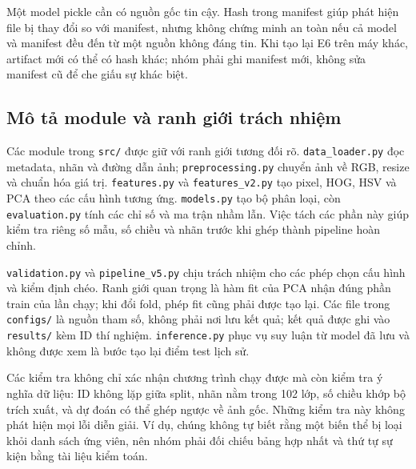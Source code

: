 Một model pickle cần có nguồn gốc tin cậy. Hash trong manifest giúp phát hiện file bị thay đổi so với manifest, nhưng không chứng minh an toàn nếu cả model và manifest đều đến từ một nguồn không đáng tin. Khi tạo lại E6 trên máy khác, artifact mới có thể có hash khác; nhóm phải ghi manifest mới, không sửa manifest cũ để che giấu sự khác biệt.
\subsection{Mô tả module và ranh giới trách nhiệm}
Các module trong \texttt{src/} được giữ với ranh giới tương đối rõ. \texttt{data\_loader.py} đọc metadata, nhãn và đường dẫn ảnh; \texttt{preprocessing.py} chuyển ảnh về RGB, resize và chuẩn hóa giá trị. \texttt{features.py} và \texttt{features\_v2.py} tạo pixel, HOG, HSV và PCA theo các cấu hình tương ứng. \texttt{models.py} tạo bộ phân loại, còn \texttt{evaluation.py} tính các chỉ số và ma trận nhầm lẫn. Việc tách các phần này giúp kiểm tra riêng số mẫu, số chiều và nhãn trước khi ghép thành pipeline hoàn chỉnh.

\texttt{validation.py} và \texttt{pipeline\_v5.py} chịu trách nhiệm cho các phép chọn cấu hình và kiểm định chéo. Ranh giới quan trọng là hàm fit của PCA nhận đúng phần train của lần chạy; khi đổi fold, phép fit cũng phải được tạo lại. Các file trong \texttt{configs/} là nguồn tham số, không phải nơi lưu kết quả; kết quả được ghi vào \texttt{results/} kèm ID thí nghiệm. \texttt{inference.py} phục vụ suy luận từ model đã lưu và không được xem là bước tạo lại điểm test lịch sử.

Các kiểm tra không chỉ xác nhận chương trình chạy được mà còn kiểm tra ý nghĩa dữ liệu: ID không lặp giữa split, nhãn nằm trong 102 lớp, số chiều khớp bộ trích xuất, và dự đoán có thể ghép ngược về ảnh gốc. Những kiểm tra này không phát hiện mọi lỗi diễn giải. Ví dụ, chúng không tự biết rằng một biến thể bị loại khỏi danh sách ứng viên, nên nhóm phải đối chiếu bảng hợp nhất và thứ tự sự kiện bằng tài liệu kiểm toán.
